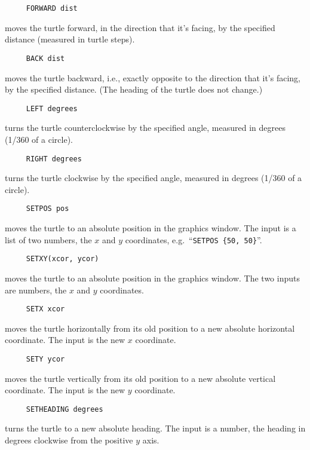 \begin{verbatim}
     FORWARD dist
\end{verbatim}
moves the turtle forward, in the direction that it's facing, by the
specified distance (measured in turtle steps).

\begin{verbatim}
     BACK dist
\end{verbatim}
moves the turtle backward, i.e., exactly opposite to the direction
that it's facing, by the specified distance.  (The heading of the
turtle does not change.)

\begin{verbatim}
     LEFT degrees
\end{verbatim}
turns the turtle counterclockwise by the specified angle, measured in
degrees (1/360 of a circle).

\begin{verbatim}
     RIGHT degrees
\end{verbatim}
turns the turtle clockwise by the specified angle, measured in degrees
(1/360 of a circle).

\begin{verbatim}
     SETPOS pos
\end{verbatim}
\label{logoturtle:setpos}
moves the turtle to an absolute position in the graphics window.  The
input is a list of two numbers, the $x$ and $y$ coordinates,
e.g.\ ``\texttt{SETPOS \{50, 50\}}''.

\begin{verbatim}
     SETXY(xcor, ycor)
\end{verbatim}
moves the turtle to an absolute position in the graphics window.  The
two inputs are numbers, the $x$ and $y$ coordinates.

\begin{verbatim}
     SETX xcor
\end{verbatim}
moves the turtle horizontally from its old position to a new absolute
horizontal coordinate.  The input is the new $x$ coordinate.

\begin{verbatim}
     SETY ycor
\end{verbatim}
moves the turtle vertically from its old position to a new absolute
vertical coordinate.  The input is the new $y$ coordinate.

\begin{verbatim}
     SETHEADING degrees
\end{verbatim}
\label{logoturtle:setheading}
turns the turtle to a new absolute heading.  The input is a number,
the heading in degrees clockwise from the positive $y$ axis.

